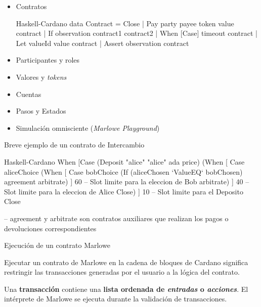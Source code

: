 \documentclass{beamer}
\newcommand{\nologo}{\setbeamertemplate{logo}{}} %
\begin{document}
{\nologo
\begin{frame}[fragile]
\begin{itemize}
    \item Contratos
        \pause

\begin{code}{Haskell-Cardano}
data Contract = Close
              | Pay party payee token value contract
              | If observation contract1 contract2
              | When [Case] timeout contract
              | Let valueId value contract
              | Assert observation contract
\end{code}
        \pause
    \item Participantes y roles
        \pause
    \item Valores y \textit{tokens}
        \pause
    \item Cuentas
        \pause
    \item Pasos y Estados
        \pause
    \item Simulación omnisciente (\textit{Marlowe Playground})

\end{itemize}
\end{frame}
}
{\nologo
\begin{frame}[fragile]{Breve ejemplo de un contrato de Intercambio}
\begin{code}{Haskell-Cardano}
When [Case (Deposit "alice" "alice" ada price)   
        (When [ Case aliceChoice
                  (When [ Case bobChoice
                            (If (aliceChosen `ValueEQ` bobChosen)
                                 agreement
                                 arbitrate) 
                        ]
                        60 -- Slot limite para la eleccion de Bob
                        arbitrate)
              ]
              40  -- Slot limite para la eleccion de Alice
              Close)
     ]
     10   -- Slot limite para el Deposito
     Close    

-- agreement y arbitrate son contratos auxiliares que realizan los pagos o devoluciones correspondientes
\end{code}

\end{frame}
}

\begin{frame}{Ejecución de un contrato Marlowe}

Ejecutar un contrato de Marlowe en la cadena de bloques de Cardano significa restringir las transacciones generadas por el usuario a la lógica del contrato.
\vfill
\pause

Una \textbf{transacción} contiene una \textbf{lista ordenada de \textit{entradas} o \textit{acciones}}. El intérprete de Marlowe se ejecuta durante la validación de transacciones. 

\end{frame}
\end{document}
